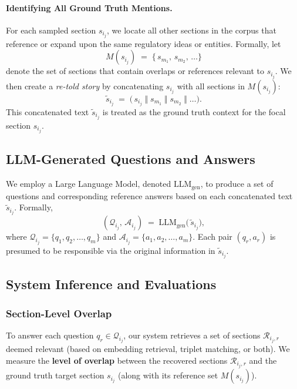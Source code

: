 \documentclass{article}
\begin{document}
\paragraph{Identifying All Ground Truth Mentions.}
For each sampled section \(s_{i_j}\), we locate all other sections in the corpus that reference or expand upon the same regulatory ideas or entities. Formally, let
\[
M(s_{i_j}) \;=\; \bigl\{\, s_{m_1},\, s_{m_2},\, \dots \bigr\}
\]
denote the set of sections that contain overlaps or references relevant to \(s_{i_j}\). We then create a \emph{re-told story} by concatenating \(s_{i_j}\) with all sections in \(M(s_{i_j})\):
\[
\widetilde{s}_{i_j}
\;=\;
\bigl(\,
s_{i_j}
\;\Vert\;
s_{m_1}
\;\Vert\;
s_{m_2}
\;\Vert\;\dots
\bigr).
\]
This concatenated text \(\widetilde{s}_{i_j}\) is treated as the ground truth context for the focal section \(s_{i_j}\).

\subsection{LLM-Generated Questions and Answers}

We employ a Large Language Model, denoted \(\mathrm{LLM}_{\text{gen}}\), to produce a set of questions and corresponding reference answers based on each concatenated text \(\widetilde{s}_{i_j}\). Formally,
\[
(\mathcal{Q}_{i_j},\, \mathcal{A}_{i_j})
\;=\;
\mathrm{LLM}_{\text{gen}}\bigl(\,\widetilde{s}_{i_j}\bigr),
\]
where \(\mathcal{Q}_{i_j} = \{q_1, q_2, \dots, q_m\}\) and \(\mathcal{A}_{i_j} = \{a_1, a_2, \dots, a_m\}\). Each pair \((q_r, a_r)\) is presumed to be responsible via the original information in \(\widetilde{s}_{i_j}\).

\subsection{System Inference and Evaluations}

\subsubsection{Section-Level Overlap}

To answer each question \(q_r \in \mathcal{Q}_{i_j}\), our system retrieves a set of sections \(\mathcal{R}_{i_j,r}\) deemed relevant (based on embedding retrieval, triplet matching, or both). We measure the \textbf{level of overlap} between the recovered sections \(\mathcal{R}_{i_j,r}\) and the ground truth target section \(s_{i_j}\) (along with its reference set \(M(s_{i_j})\)).
\end{document}
